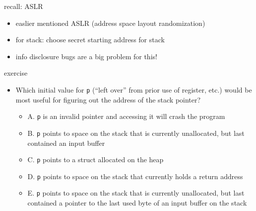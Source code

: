 \begin{frame}{recall: ASLR}
    \begin{itemize}
    \item easlier mentioned ASLR (address space layout randomization)
    \item for stack: choose secret starting address for stack
    \vspace{.5cm}
    \item info disclosure bugs are a big problem for this!
    \end{itemize}
\end{frame}

\begin{frame}[fragile,label=infoDiscEx]{exercise}
\vspace{-.25cm}
\begin{itemize}
\item Which initial value for \texttt{p} (``left over'' from prior use of register, etc.) would be most useful for figuring out the address of the stack pointer?
\begin{itemize}
\item A. \texttt{p} is an invalid pointer and accessing it will crash the program
\item B. \texttt{p} points to space on the stack that is currently unallocated, but last contained an input buffer
\item C. \texttt{p} points to a struct allocated on the heap
\item D. \texttt{p} points to space on the stack that currently holds a return address
\item E. \texttt{p} points to space on the stack that is currently unallocated, but last contained a pointer to the last used byte of an input buffer on the stack
\end{itemize}
\end{itemize}
\end{frame}
